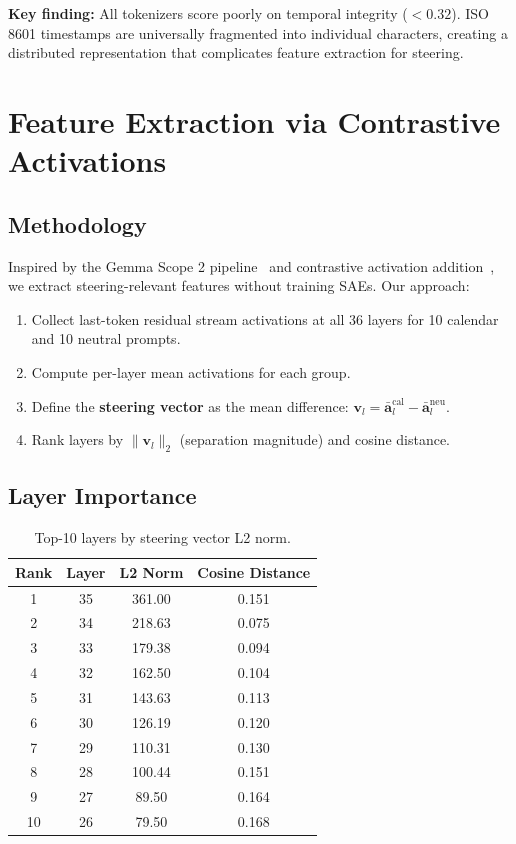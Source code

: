 \documentclass[11pt,a4paper]{article}
\begin{document}
\textbf{Key finding:} All tokenizers score poorly on temporal integrity ($<0.32$). ISO 8601 timestamps are universally fragmented into individual characters, creating a distributed representation that complicates feature extraction for steering.

\section{Feature Extraction via Contrastive Activations}
\label{sec:features}

\subsection{Methodology}

Inspired by the Gemma Scope 2 pipeline~\cite{lieberum2024gemma} and contrastive activation addition~\cite{turner2023activation}, we extract steering-relevant features without training SAEs. Our approach:

\begin{enumerate}
    \item Collect last-token residual stream activations at all 36 layers for 10 calendar and 10 neutral prompts.
    \item Compute per-layer mean activations for each group.
    \item Define the \textbf{steering vector} as the mean difference: $\mathbf{v}_l = \bar{\mathbf{a}}_l^{\text{cal}} - \bar{\mathbf{a}}_l^{\text{neu}}$.
    \item Rank layers by $\|\mathbf{v}_l\|_2$ (separation magnitude) and cosine distance.
\end{enumerate}

\subsection{Layer Importance}

\begin{table}[H]
\centering
\caption{Top-10 layers by steering vector L2 norm.}
\label{tab:layer_importance}
\begin{tabular}{cccc}
\toprule
\textbf{Rank} & \textbf{Layer} & \textbf{L2 Norm} & \textbf{Cosine Distance} \\
\midrule
1 & 35 & 361.00 & 0.151 \\
2 & 34 & 218.63 & 0.075 \\
3 & 33 & 179.38 & 0.094 \\
4 & 32 & 162.50 & 0.104 \\
5 & 31 & 143.63 & 0.113 \\
6 & 30 & 126.19 & 0.120 \\
7 & 29 & 110.31 & 0.130 \\
8 & 28 & 100.44 & 0.151 \\
9 & 27 & 89.50 & 0.164 \\
10 & 26 & 79.50 & 0.168 \\
\bottomrule
\end{tabular}
\end{table}
\end{document}
